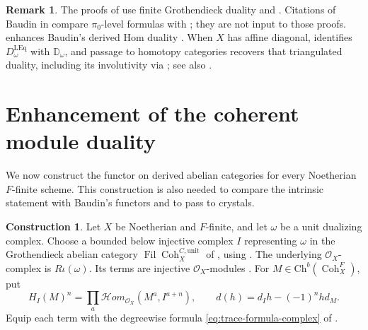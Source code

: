 \documentclass[11pt]{amsart}
\newcommand{\cO}{\mathcal{O}}
\newcommand{\Coh}{\operatorname{{Coh}}}
\newcommand{\Fil}{{\operatorname{Fil}}}
\newcommand{\Ch}{\mathrm{Ch}}
\newcommand{\shHom}{\mathcal Hom}
\theoremstyle{plain}
\theoremstyle{definition}
\newtheorem{construction}[construction]{Construction}
\newtheorem{remark}[remark]{Remark}
\numberwithin{equation}{section}
\begin{document}
\begin{remark}\label{rem:sec3-no-baudin}
The proofs of  use finite Grothendieck duality and .
Citations of Baudin in  compare $\pi_0$-level formulas with \cite[Lemma 3.4.1; Construction 4.1.1]{Bau}; they are not input to those proofs.
 enhances Baudin's derived Hom duality \cite[Theorem 4.2.7]{Bau}.
When $X$ has affine diagonal,  identifies $D_\omega^{\mathrm{LEq}}$ with $\mathbb D_\omega$, and passage to homotopy categories recovers that triangulated duality, including its involutivity via ; see also .
\end{remark}

\section{Enhancement of the coherent module duality}\label{sec:modules}
We now construct the functor on derived abelian categories for every Noetherian $F$-finite scheme.
This construction is also needed to compare the intrinsic statement with Baudin's functors and to pass to crystals.

\begin{construction}\label{cons:hom}
Let $X$ be Noetherian and $F$-finite, and let $\omega$ be a unit dualizing complex.
Choose a bounded below injective complex $I$ representing $\omega$ in the Grothendieck abelian category $\Fil\Coh^{C,\mathrm{unit}}_X$ of , using \cite[Corollary 3.4.9]{Bau}.
The underlying $\cO_X$-complex is $R\iota(\omega)$.
Its terms are injective $\cO_X$-modules \cite[Corollary 3.4.10]{Bau}.
For $M\in\Ch^b(\Coh^F_X)$, put
\begin{equation}\label{eq:hom-complex}
 H_I(M)^n=\prod_a\shHom_{\cO_X}(M^a,I^{a+n}),\qquad
 d(h)=d_Ih-(-1)^nhd_M.
\end{equation}
Equip each term with the degreewise formula \eqref{eq:trace-formula-complex} of .
\end{construction}
\end{document}
